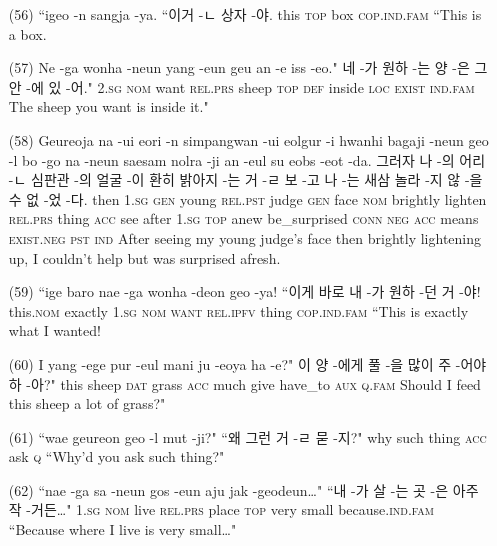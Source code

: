 \begin{itemize}
\item [(56)]
\tgl
		{``igeo -n sangja -ya.}
		{``이거 -ㄴ 상자 -야.}
		{this	\textsc{top}	box	\textsc{cop.ind.fam}}
		{``This is a box.}

\item [(57)]
\tgl
		{Ne -ga wonha -neun yang -eun geu an -e iss -eo."}
		{네 -가 원하 -는 양 -은 그 안 -에 있 -어."}
		{\textsc{2.sg}	\textsc{nom}	want	\textsc{rel.prs}	sheep	\textsc{top}	\textsc{def}	inside	\textsc{loc}	\textsc{exist}	\textsc{ind.fam}}
		{The sheep you want is inside it."}
		
\item [(58)]
\tgl
		{Geureoja na -ui eori -n simpangwan -ui eolgur -i hwanhi bagaji -neun geo -l bo -go na -neun saesam nolra -ji an -eul su eobs -eot -da.}
		{그러자 나 -의 어리 -ㄴ 심판관 -의 얼굴 -이 환히 밝아지 -는 거 -ㄹ 보 -고 나 -는 새삼 놀라 -지 않 -을 수 없 -었 -다.}
		{then	\textsc{1.sg}	\textsc{gen}	young	\textsc{rel.pst}	judge	\textsc{gen}	face	\textsc{nom}	brightly	lighten	\textsc{rel.prs}	thing	\textsc{acc}	see	after	\textsc{1.sg}	\textsc{top}	anew	be\_surprised	\textsc{conn}	\textsc{neg}	\textsc{acc}	means	\textsc{exist.neg}	\textsc{pst}	\textsc{ind}}
		{After seeing my young judge's face then brightly lightening up, I couldn't help but was surprised afresh.}
		
\item [(59)]
\tgl
		{``ige baro nae -ga wonha -deon geo -ya!}
		{``이게 바로 내 -가 원하 -던 거 -야!}
		{this.\textsc{nom}	exactly	\textsc{1.sg}	\textsc{nom}	\textsc{want}	\textsc{rel.ipfv}	thing	\textsc{cop.ind.fam}}
		{``This is exactly what I wanted!}

\item [(60)]
\tgl
		{I yang -ege pur -eul mani ju -eoya ha -e?"}
		{이 양 -에게 풀 -을 많이 주 -어야 하 -아?"}
		{this	sheep	\textsc{dat}	grass	\textsc{acc}	much	give	have\_to	\textsc{aux}	\textsc{q.fam}}
		{Should I feed this sheep a lot of grass?"}

\item [(61)]
\tgl
		{``wae geureon geo -l mut -ji?"}
		{``왜 그런 거 -ㄹ 묻 -지?"}
		{why	such	thing	\textsc{acc}	ask	\textsc{q}}
		{``Why'd you ask such thing?"}
		
\item [(62)]
\tgl
		{``nae -ga sa -neun gos -eun aju jak -geodeun…"}
		{``내 -가 살 -는 곳 -은 아주 작 -거든…"}
		{\textsc{1.sg}	\textsc{nom}	live	\textsc{rel.prs}	place	\textsc{top}	very	small	because.\textsc{ind.fam}}
		{``Because where I live is very small…"}


\end{itemize}
